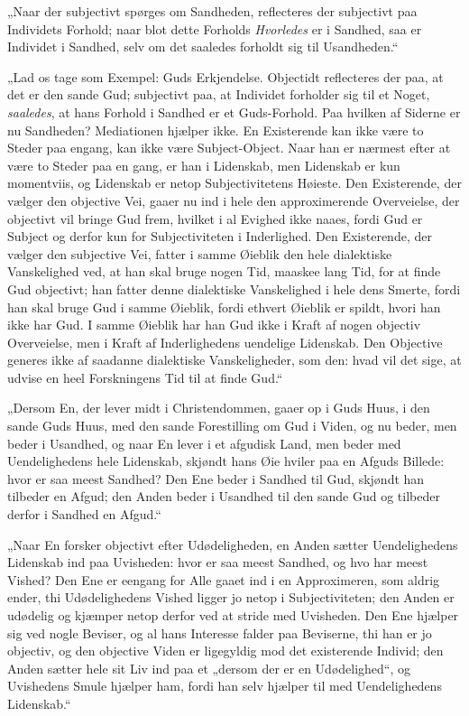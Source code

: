 „Naar der subjectivt spørges om Sandheden, reflecteres der
subjectivt paa Individets Forhold; naar blot dette Forholds
\emph{Hvorledes} er i Sandhed, saa er Individet i Sandhed, selv om
det saaledes forholdt sig til Usandheden.“

„Lad os tage som Exempel: Guds Erkjendelse. Objectidt reflecteres
der paa, at det er den sande Gud; subjectivt paa, at Individet
forholder sig til et Noget, \emph{saaledes}, at hans Forhold i
Sandhed er et Guds-Forhold. Paa hvilken af Siderne er nu
Sandheden? Mediationen hjælper ikke. En Existerende kan ikke være
to Steder paa engang, kan ikke være Subject-Object. Naar han er
nærmest efter at være to Steder paa en%
gang, er han i Lidenskab, men Lidenskab er kun momentviis, og
Lidenskab er netop Subjectivitetens Høieste. Den Existerende, der
vælger den objective Vei, gaaer nu ind i hele den approximerende
Overveielse, der objectivt vil bringe Gud frem, hvilket i al
Evighed ikke naaes, fordi Gud er Subject og derfor kun for
Subjectiviteten i Inderlighed. Den Existerende, der vælger den
subjective Vei, fatter i samme Øieblik den hele dialektiske
Vanskelighed ved, at han skal bruge nogen Tid, maaskee lang Tid,
for at finde Gud objectivt; han fatter denne dialektiske
Vanskelighed i hele dens Smerte, fordi han skal bruge Gud i samme
Øieblik, fordi ethvert Øieblik er spildt, hvori han ikke har Gud.
I samme Øieblik har han Gud ikke i Kraft af nogen objectiv
Overveielse, men i Kraft af Inderlighedens uendelige Lidenskab.
Den Objective generes ikke af saadanne dialektiske Vanskeligheder,
som den: hvad vil det sige, at udvise en heel Forskningens Tid til
at finde Gud.“

„Dersom En, der lever midt i Christendommen, gaaer op i Guds Huus,
i den sande Guds Huus, med den sande Forestilling om Gud i Viden,
og nu beder, men beder i Usandhed, og naar En lever i et afgudisk
Land, men beder med Uendelighedens hele Lidenskab, skjøndt hans
Øie hviler paa en Afguds Billede: hvor er saa meest Sandhed? Den
Ene beder i Sandhed til Gud, skjøndt han tilbeder en Afgud; den
Anden beder i Usandhed til den sande Gud og tilbeder derfor i
Sandhed en Afgud.“

 „Naar En forsker objectivt efter Udødeligheden, en Anden sætter
Uendelighedens Lidenskab ind paa Uvisheden: hvor er saa meest
Sandhed, og hvo har meest Vished? Den Ene er eengang for Alle
gaaet ind i en Approximeren, som aldrig ender, thi Udødelighedens
Vished ligger jo netop i Subjectiviteten; den Anden er udødelig og
kjæmper netop derfor ved at stride med Uvisheden. Den Ene hjælper
sig ved nogle Beviser, og al hans Interesse falder paa Beviserne,
thi han er jo objectiv, og den objective Viden er ligegyldig mod
det existerende Individ; den Anden sætter hele sit Liv ind paa et
„dersom der er en Udødelighed“, og Uvishedens Smule hjælper ham,
fordi han selv hjælper til med Uendelighedens Lidenskab.“

